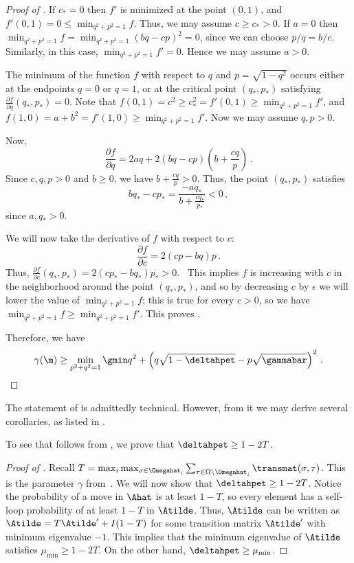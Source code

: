 \begin{proof}[Proof of ]
If $c_*=0$ then $f'$ is minimized at the point $(0,1)$, and $ f'(0,1)=0\leq  \min_{q^2+p^2=1} f$.  Thus, we may assume $c\geq c_*>0$.  If $a=0$ then $\min_{q^2+p^2=1} f =  \min_{q^2+p^2=1}(bq-cp)^2 = 0$, since we can choose $p/q = b/c$.  Similarly, in this case, $\min_{q^2+p^2=1} f'=0$.  Hence we may assume $a>0$.


The minimum of the function $f$ with respect to $q$ and $p=\sqrt{1-q^2}$ occurs either at the endpoints $q=0$ or $q=1$, or at the critical point $(q_*, p_*)$ satisfying $\frac{\partial f}{\partial q}(q_*,p_*)=0$.
Note that $f(0,1) = c^2\geq c_*^2=f'(0,1)\geq \min_{q^2+p^2=1} f'$, and $f(1,0) = a+b^2=f'(1,0)\geq \min_{q^2+p^2=1} f'$.  
Now we may assume $q, p>0$.   

Now,
\[\frac{\partial f}{\partial q}  = 2aq + 2(bq-cp)\left(b+\frac{cq}{p}\right)\,.\]
Since $c,q,p>0$ and $b\geq 0$, we have $b+\frac{cq}{p}>0$.  Thus, the point $(q_*,p_*)$  satisfies
\[bq_*-cp_* = \frac{-aq_*}{b+\frac{cq_*}{p_*}}< 0\,,\]
since $a,q_*>0$.  



%
We will now take the derivative of $f$ with respect to $c$:
\[\frac{\partial f}{\partial c}  = 2(cp-bq)p\,.\]
Thus, $\frac{\partial f}{\partial c}(q_*,p_*) = 2(cp_*-bq_*)p_* >0$.  This implies $f$ is increasing with $c$ in the neighborhood around the point $(q_*, p_*)$, and so by decreasing $c$ by $\epsilon$ we will lower the value of $\min_{q^2+p^2=1} f$; this is true for every $c>0$, so we have $\min_{q^2+p^2=1} f \geq \min_{q^2+p^2=1} f'$.  This proves .
%
%


Therefore, we have
\[\gamma(\m) \geq  \min_{p^2+q^2=1}\gmin q^2+\left(q\sqrt{1-\deltahpet} - p\sqrt{\gammabar}\right)^2\,.\qedhere\]
\end{proof}
%

The statement of  is admittedly technical.
However, from it we may derive several corollaries, as listed in . 

To see that  follows from
, we prove that $\deltahpet\geq 1-2T$.

%
%
%
\begin{proof}[Proof of ]
Recall $T = 
\max_i\max_{\sigma\in\Omegahat_i}\sum_{\tau\in\Omega\setminus\Omegahat_i}\transmat(\sigma,\tau)$.  
This is the parameter $\gamma$ from~\cite{jstv04}. We will now show that $\deltahpet\geq 1-2T$.
Notice the probability of a move in $\Ahat$ is at least 
$1-T$, so every element has a self-loop probability of at least $1-T$ 
in $\Atilde$. 
Thus, $\Atilde$ can be 
written as $\Atilde = T\Atilde' + I(1-T)$ for some transition matrix 
$\Atilde'$ with minimum eigenvalue $-1$.  This implies that the 
minimum eigenvalue of $\Atilde$ satisfies $\mu_{\min}\geq 1-2T$.  On 
the other hand, $\deltahpet\geq \mu_{\min}$. 
\end{proof}
%

